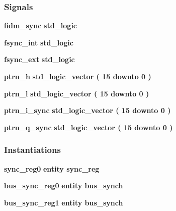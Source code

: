 \subsubsection*{Signals}
 \begin{DoxyCompactItemize}
\item 
{\bf fidm\+\_\+sync} {\bfseries \textcolor{comment}{std\+\_\+logic}\textcolor{vhdlchar}{ }} 
\item 
{\bf fsync\+\_\+int} {\bfseries \textcolor{comment}{std\+\_\+logic}\textcolor{vhdlchar}{ }} 
\item 
{\bf fsync\+\_\+ext} {\bfseries \textcolor{comment}{std\+\_\+logic}\textcolor{vhdlchar}{ }} 
\item 
{\bf ptrn\+\_\+h} {\bfseries \textcolor{comment}{std\+\_\+logic\+\_\+vector}\textcolor{vhdlchar}{ }\textcolor{vhdlchar}{(}\textcolor{vhdlchar}{ }\textcolor{vhdlchar}{ } \textcolor{vhdldigit}{15} \textcolor{vhdlchar}{ }\textcolor{keywordflow}{downto}\textcolor{vhdlchar}{ }\textcolor{vhdlchar}{ } \textcolor{vhdldigit}{0} \textcolor{vhdlchar}{ }\textcolor{vhdlchar}{)}\textcolor{vhdlchar}{ }} 
\item 
{\bf ptrn\+\_\+l} {\bfseries \textcolor{comment}{std\+\_\+logic\+\_\+vector}\textcolor{vhdlchar}{ }\textcolor{vhdlchar}{(}\textcolor{vhdlchar}{ }\textcolor{vhdlchar}{ } \textcolor{vhdldigit}{15} \textcolor{vhdlchar}{ }\textcolor{keywordflow}{downto}\textcolor{vhdlchar}{ }\textcolor{vhdlchar}{ } \textcolor{vhdldigit}{0} \textcolor{vhdlchar}{ }\textcolor{vhdlchar}{)}\textcolor{vhdlchar}{ }} 
\item 
{\bf ptrn\+\_\+i\+\_\+sync} {\bfseries \textcolor{comment}{std\+\_\+logic\+\_\+vector}\textcolor{vhdlchar}{ }\textcolor{vhdlchar}{(}\textcolor{vhdlchar}{ }\textcolor{vhdlchar}{ } \textcolor{vhdldigit}{15} \textcolor{vhdlchar}{ }\textcolor{keywordflow}{downto}\textcolor{vhdlchar}{ }\textcolor{vhdlchar}{ } \textcolor{vhdldigit}{0} \textcolor{vhdlchar}{ }\textcolor{vhdlchar}{)}\textcolor{vhdlchar}{ }} 
\item 
{\bf ptrn\+\_\+q\+\_\+sync} {\bfseries \textcolor{comment}{std\+\_\+logic\+\_\+vector}\textcolor{vhdlchar}{ }\textcolor{vhdlchar}{(}\textcolor{vhdlchar}{ }\textcolor{vhdlchar}{ } \textcolor{vhdldigit}{15} \textcolor{vhdlchar}{ }\textcolor{keywordflow}{downto}\textcolor{vhdlchar}{ }\textcolor{vhdlchar}{ } \textcolor{vhdldigit}{0} \textcolor{vhdlchar}{ }\textcolor{vhdlchar}{)}\textcolor{vhdlchar}{ }} 
\end{DoxyCompactItemize}
\subsubsection*{Instantiations}
 \begin{DoxyCompactItemize}
\item 
{\bf sync\+\_\+reg0}  {\bfseries entity sync\+\_\+reg}   
\item 
{\bf bus\+\_\+sync\+\_\+reg0}  {\bfseries entity bus\+\_\+synch}   
\item 
{\bf bus\+\_\+sync\+\_\+reg1}  {\bfseries entity bus\+\_\+synch}   
\end{DoxyCompactItemize}


